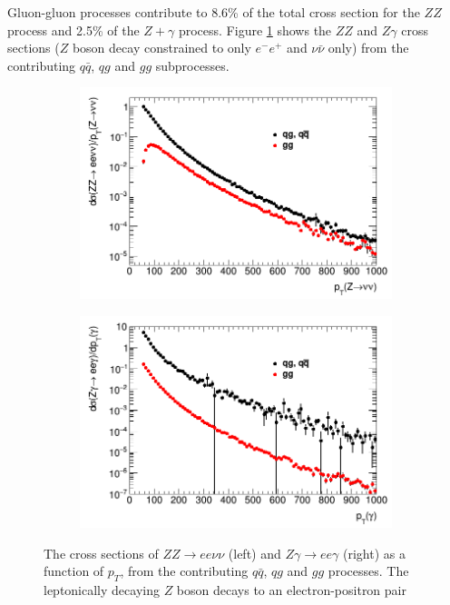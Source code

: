 \documentclass[11pt,a4paper]{report}
\begin{document}
Gluon-gluon processes contribute to 8.6\% of the total cross section for the $ZZ$ process and 2.5\% of the $Z+\gamma$ process. Figure \ref{fig:xsec_gg_qq} shows the $ZZ$ and $Z\gamma$ cross sections ($Z$ boson decay constrained to only $e^-e^+$ and $\nu\bar{\nu}$ only) from the contributing $q\bar{q}$, $qg$ and $gg$ subprocesses.
\begin{figure}[H]
\centering
	\begin{subfigure}{0.49\textwidth}
		\includegraphics[width=\linewidth]{ZZ_subproc.png}
	\end{subfigure}
	\begin{subfigure}{0.49\textwidth}
		\includegraphics[width=\linewidth]{Zg_subproc.png}
	\end{subfigure}	
\caption{The cross sections of $ZZ\to ee\nu\nu$ (left) and $Z\gamma\to ee\gamma$ (right) as a function of $p_T$, from the contributing $q\bar{q}$, $qg$ and $gg$ processes. The leptonically decaying $Z$ boson decays to an electron-positron pair}
\label{fig:xsec_gg_qq}
\end{figure}
\end{document}
